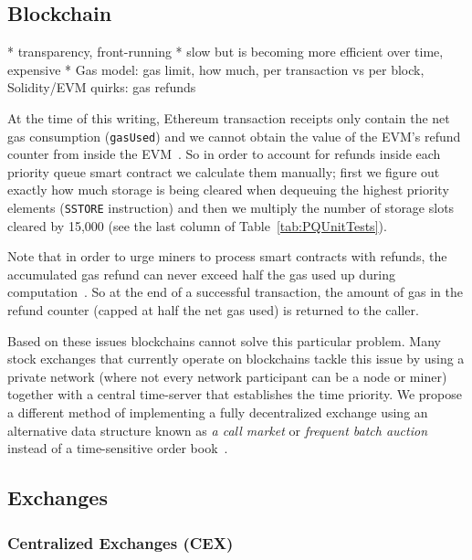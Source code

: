 \subsection{Blockchain}

* transparency, front-running
* slow but is becoming more efficient over time, expensive
* Gas model: gas limit, how much, per transaction vs per block, Solidity/EVM quirks: gas refunds

At the time of this writing, Ethereum transaction receipts only contain the net gas consumption (\texttt{gasUsed}) and we cannot obtain the value of the EVM's refund counter from inside the EVM~\cite{signer2018gas}. So in order to account for refunds inside each priority queue smart contract we calculate them manually; first we figure out exactly how much storage is being cleared when dequeuing the highest priority elements (\texttt{SSTORE} instruction) and then we multiply the number of storage slots cleared by 15,000 (see the last column of Table~\ref{tab:PQUnitTests}).

Note that in order to urge miners to process smart contracts with refunds, the accumulated gas refund can never exceed half the gas used up during computation~\cite{wood2014ethereum}. So at the end of a successful transaction, the amount of gas in the refund counter (capped at half the net gas used) is returned to the caller. 


Based on these issues blockchains cannot solve this particular problem. Many stock exchanges that currently operate on blockchains tackle this issue by using a private network (where not every network participant can be a node or miner) together with a central time-server that establishes the time priority. We propose a different method of implementing a fully decentralized exchange using an alternative data structure known as \textit{a call market} or \textit{frequent batch auction} instead of a time-sensitive order book~\cite{clark2014decentralizing}.



\subsection{Exchanges}

\subsubsection{Centralized Exchanges (CEX)}\label{sec:CEX}

